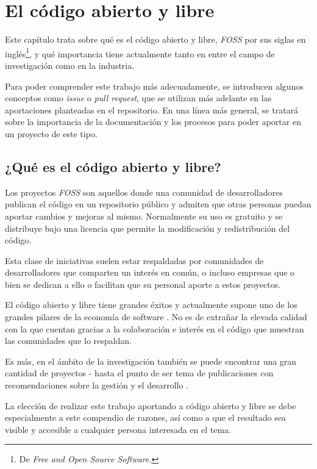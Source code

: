 \chapter{El código abierto y libre} \label{chp:FOSS}

Este capítulo trata sobre qué es el código abierto y libre, \textit{FOSS} por sus siglas en inglés\footnote{De \textit{Free and Open Source Software}.}, y qué importancia tiene actualmente tanto en entre el campo de investigación como en la industria.

Para poder comprender este trabajo más adecuadamente, se introducen algunos conceptos como \textit{issue} o \textit{pull request}, que se utilizan más adelante en las aportaciones planteadas en el repositorio. En una línea más general, se tratará sobre la importancia de la documentación y los procesos para poder aportar en un proyecto de este tipo.

\section{¿Qué es el código abierto y libre?} \label{sct:que_es_FOSS}

Los proyectos \textit{FOSS} son aquellos donde una comunidad de desarrolladores publican el código en un repositorio público y admiten que otras personas puedan aportar cambios y mejoras al mismo. Normalmente su uso es gratuito y se distribuye bajo una licencia que permite la modificación y redistribución del código.

Esta clase de iniciativas suelen estar respaldadas por comunidades de desarrolladores que comparten un interés en común, o incluso empresas que o bien se dedican a ello o facilitan que su personal aporte a estos proyectos.

El código abierto y libre tiene grandes éxitos y actualmente supone uno de los grandes pilares de la economía de software \cite{dibona1999open, a556016d-4d87-3a33-80d5-87839d42cc50}. No es de extrañar la elevada calidad con la que cuentan \cite{Alenezi_Abunadi_2015} gracias a la colaboración e interés en el código que muestran las comunidades que lo respaldan.

Es más, en el ámbito de la investigación también se puede encontrar una gran cantidad de proyectos - hasta el punto de ser tema de publicaciones con recomendaciones sobre la gestión y el desarrollo \cite{10.1145/3472749.3474819}.

La elección de realizar este trabajo aportando a código abierto y libre se debe especialmente a este compendio de razones, así como a que el resultado sea visible y accesible a cualquier persona interesada en el tema.

